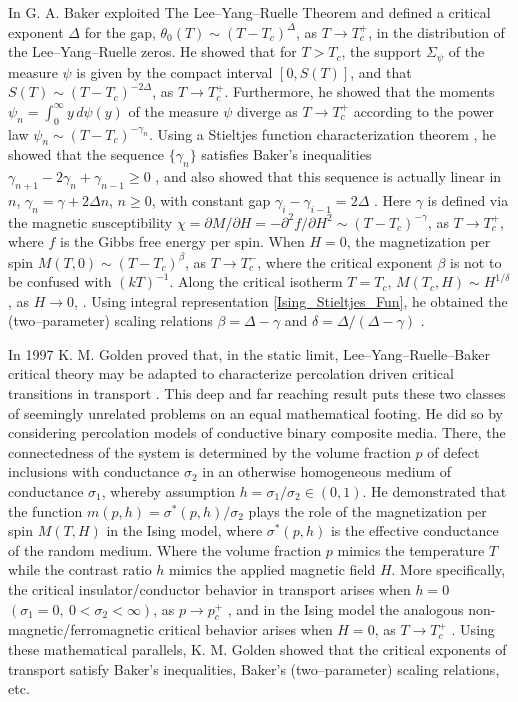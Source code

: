 \documentclass[english,12pt,jmp,graphicx]{revtex4-1}
\begin{document}
In \cite{Baker:PRB:1184,Baker-1990} G. A. Baker exploited The
Lee--Yang--Ruelle Theorem and defined a critical exponent $\Delta$ for
the gap, $\theta_0(T)\sim(T-T_c)^\Delta$, as $T\to T_c^+$, in the distribution of the
Lee--Yang--Ruelle zeros. He showed that for $T>T_c$, the support $\Sigma_\psi$
of the measure $\psi$ is given by the compact interval $[0,S(T)]$, and that
$S(T)\sim(T-T_c)^{-2\Delta}$, as $T\to T_c^+$. Furthermore, he showed that the moments
$\psi_n=\int_0^\infty y\,d\psi(y)$ of the measure $\psi$ diverge as $T\to T_c^+$ according to 
the power law $\psi_n\sim(T-T_c)^{-\gamma_n}$. Using a Stieltjes function
characterization theorem \cite{Baker-1990}, he showed that the sequence
$\{\gamma_n\}$ satisfies Baker's inequalities $\gamma_{n+1}-2\gamma_n+\gamma_{n-1}\geq0$
\cite{Baker:PRL-990}, and also showed that this sequence is actually
linear in $n$, $\gamma_n=\gamma+2\Delta n$, $n\geq0$, with constant gap
$\gamma_i-\gamma_{i-1}=2\Delta$ \cite{Baker-1990}. Here $\gamma$ is defined via the
magnetic susceptibility $\chi=\partial M/\partial H=-\partial^2f/\partial H^2\sim(T-T_c)^{-\gamma}$, as
$T\to T_c^+$, where $f$ is the Gibbs free energy per spin. When $H=0$,
the magnetization per spin $M(T,0)\sim(T-T_c)^\beta$, as $T\to T_c^-$, where
the critical exponent $\beta$ is not to be confused with
$(kT)^{-1}$. Along the critical isotherm $T=T_c$, $M(T_c,H)\sim H^{1/\delta}$, as
$H\to0$, \cite{Christensen-2005,Baker-1990}. Using integral
representation \eqref{Ising_Stieltjes_Fun}, he obtained the
(two--parameter) scaling relations $\beta=\Delta-\gamma$ and $\delta=\Delta/(\Delta-\gamma)$
\cite{Baker-1990}.  
  
In 1997 K. M. Golden proved that, in the static limit,
Lee--Yang--Ruelle--Baker critical theory may be adapted to
characterize percolation driven critical transitions in transport  
\cite{Golden:PRL-3935}. This deep and far reaching result puts these
two classes of seemingly unrelated problems on an equal mathematical
footing. He did so by considering percolation models of  
conductive binary composite media. There, the connectedness of the
system is determined by the volume fraction $p$ of defect inclusions
with conductance $\sigma_2$ in an otherwise homogeneous medium of
conductance $\sigma_1$, whereby assumption $h=\sigma_1/\sigma_2\in(0,1)$. He
demonstrated that the function $m(p,h)=\sigma^*(p,h)/\sigma_2$ plays the role of
the magnetization per spin $M(T,H)$ in the Ising model, where
$\sigma^*(p,h)$ is the effective conductance of the random medium. Where
the volume fraction $p$ mimics the temperature $T$ while the contrast
ratio $h$ mimics the applied magnetic field $H$. More specifically,
the critical insulator/conductor behavior in transport arises when
$h=0$ $(\sigma_1=0, \ 0<\sigma_2<\infty)$, as $p\to p_c^+$ \cite{Golden:PRL-3935}, and
in the Ising model the analogous non-magnetic/ferromagnetic critical
behavior arises when $H=0$, as $T\to T_c^+$
\cite{Christensen-2005}. Using these mathematical parallels,
K. M. Golden showed that the critical exponents of transport satisfy
Baker's inequalities, Baker's (two--parameter) scaling relations, etc.
\end{document}
